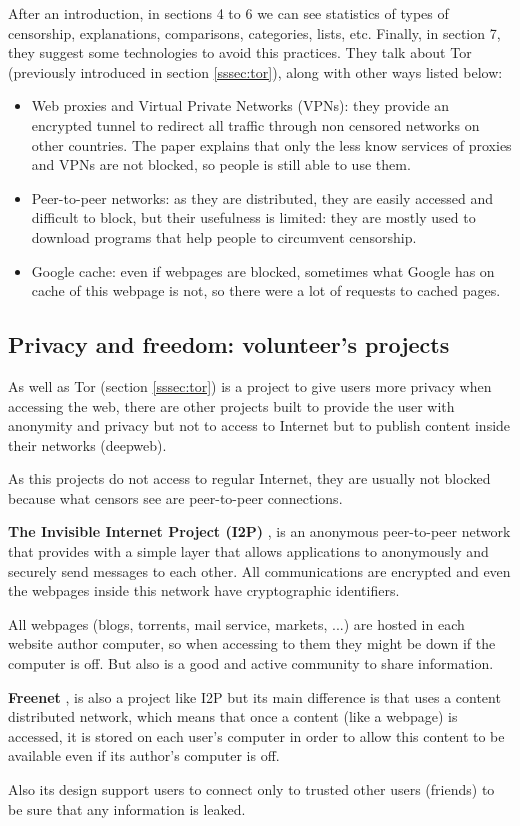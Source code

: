 After an introduction, in sections 4 to 6 we can see statistics of types of censorship, explanations, comparisons, categories, lists, etc. Finally, in section 7, they suggest some technologies to avoid this practices. They talk about Tor (previously introduced in section \ref{sssec:tor}), along with other ways listed below:
\begin{itemize}
\item Web proxies and Virtual Private Networks (VPNs): they provide an encrypted tunnel to redirect all traffic through non censored networks on other countries. The paper explains that only the less know services of proxies and VPNs are not blocked, so people is still able to use them.
\item Peer-to-peer networks: as they are distributed, they are easily accessed and difficult to block, but their usefulness is limited: they are mostly used to download programs that help people to circumvent censorship.
\item Google cache: even if webpages are blocked, sometimes what Google has on cache of this webpage is not, so there were a lot of requests to cached pages.
\end{itemize}

\subsection{Privacy and freedom: volunteer's projects}
As well as Tor (section \ref{sssec:tor}) is a project to give users more privacy when accessing the web, there are other projects built to provide the user with anonymity and privacy but not to access to Internet but to publish content inside their networks (deepweb).

As this projects do not access to regular Internet, they are usually not blocked because what censors see are peer-to-peer connections.

\begin{description}
\item \textbf{The Invisible Internet Project (I2P)} \cite{I2P}, is an anonymous peer-to-peer network that provides with a simple layer that allows applications to anonymously and securely send messages to each other. All communications are encrypted and even the webpages inside this network have cryptographic identifiers.

All webpages (blogs, torrents, mail service, markets, ...) are hosted in each website author computer, so when accessing to them they might be down if the computer is off. But also is a good and active community to share information.

\pagebreak
\item \textbf{Freenet} \cite{Freenet}, is also a project like I2P but its main difference is that uses a content distributed network, which means that once a content (like a webpage) is accessed, it is stored on each user's computer in order to allow this content to be available even if its author's computer is off.

Also its design support users to connect only to trusted other users (friends) to be sure that any information is leaked. 
\end{description}
